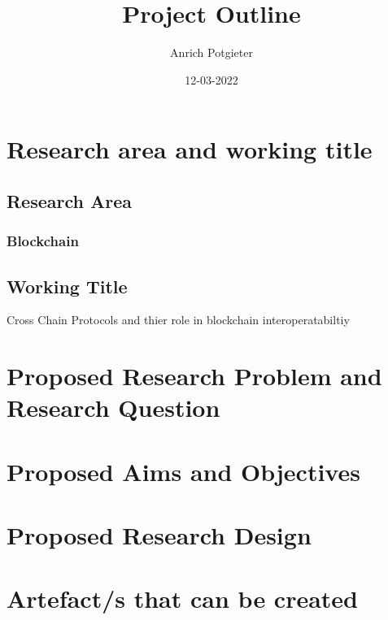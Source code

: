 \documentclass[12pt]{article}
\title{Project Outline}
\author{Anrich Potgieter}
\date{12-03-2022}
\begin{document}
\maketitle
\section{Research area and working title}
\subsection{Research Area}
\subsubsection[short]{Blockchain}
\subsection{Working Title}
Cross Chain Protocols and thier role in blockchain interoperatabiltiy
\section{Proposed Research Problem and Research Question}
\section{Proposed Aims and Objectives}
\section{Proposed Research Design}
\section{Artefact/s that can be created}
\printbibliography
\end{document}
